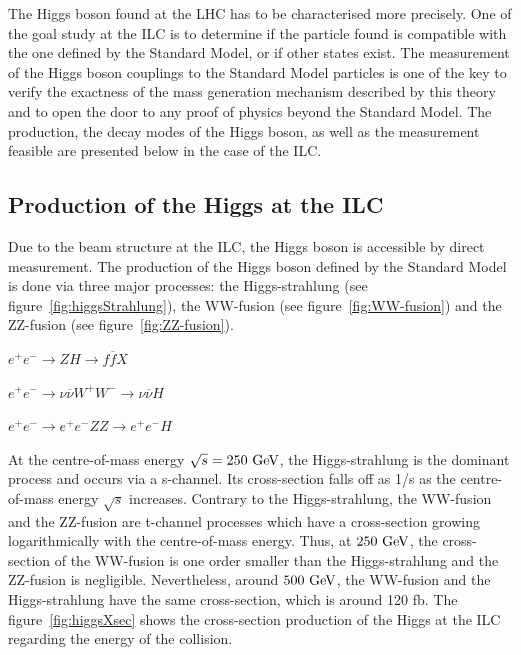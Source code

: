   The Higgs boson found at the \gls{LHC} has to be characterised more precisely.
  One of the goal study at the \gls{ILC} is to determine if the particle found is compatible with the one defined by the Standard Model, or if other states exist.
  The measurement of the Higgs boson couplings to the Standard Model particles is one of the key to verify the exactness of the mass generation mechanism described by this theory and to open the door to any proof of physics beyond the Standard Model.
  The production, the decay modes of the Higgs boson, as well as the measurement feasible are presented below in the case of the \gls{ILC}.

    \subsection{Production of the Higgs at the ILC}

    Due to the beam structure at the \gls{ILC}, the Higgs boson is accessible by direct measurement.
    The production of the Higgs boson defined by the Standard Model is done via three major processes: the Higgs-strahlung (see figure~\ref{fig:higgsStrahlung}), the WW-fusion (see figure~\ref{fig:WW-fusion}) and the ZZ-fusion (see figure~\ref{fig:ZZ-fusion}).

    \begin{description}
      \centering
      \item[Higgs-strahlung:] $e^+e^- \rightarrow ZH \rightarrow f\overline{f}X$
      \item[WW-fusion:] $e^+e^- \rightarrow \nu \overline{\nu} W^+W^- \rightarrow \nu \overline{\nu} H$
      \item[ZZ-fusion:] $e^+e^- \rightarrow e^+e^- ZZ \rightarrow e^+e^- H$
    \end{description}


    At the centre-of-mass energy $\sqrt{s} = 250~\rm{GeV}$, the Higgs-strahlung is the dominant process and occurs via a s-channel. 
    Its cross-section falls off as 1/s as the centre-of-mass energy $\sqrt{s}$ increases.
    Contrary to the Higgs-strahlung, the WW-fusion and the ZZ-fusion are t-channel processes which have a cross-section growing logarithmically with the centre-of-mass energy.
    Thus, at $250~\rm{GeV}$, the cross-section of the WW-fusion is one order smaller than the Higgs-strahlung and the ZZ-fusion is negligible.
    Nevertheless, around $500~\rm{GeV}$, the WW-fusion and the Higgs-strahlung have the same cross-section, which is around 120 fb.
    The figure~\ref{fig:higgsXsec} shows the cross-section production of the Higgs at the ILC regarding the energy of the collision.
    
